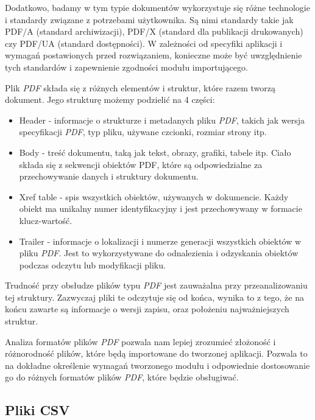 \documentclass[a4paper,twoside,12pt]{book}
\begin{document}
Dodatkowo, badamy w tym typie dokumentów wykorzystuje się różne technologie i standardy związane z potrzebami użytkownika. Są nimi standardy takie jak PDF/A (standard archiwizacji), PDF/X (standard dla publikacji drukowanych) czy PDF/UA (standard dostępności). W zależności od specyfiki aplikacji i wymagań postawionych przed rozwiązaniem, konieczne może być uwzględnienie tych standardów i zapewnienie zgodności modułu importującego.

Plik \emph{PDF} składa się z różnych elementów i struktur, które razem tworzą dokument. Jego strukturę możemy podzielić na 4 części: 
\begin{itemize}
\item Header - informacje o strukturze i metadanych pliku \emph{PDF}, takich jak wersja specyfikacji \emph{PDF}, typ pliku, używane czcionki, rozmiar strony itp.
\item Body - treść dokumentu, taką jak tekst, obrazy, grafiki, tabele itp. Ciało składa się z sekwencji obiektów PDF, które są odpowiedzialne za przechowywanie danych i struktury dokumentu.
\item Xref table - spis wszystkich obiektów, używanych w dokumencie. Każdy obiekt ma unikalny numer identyfikacyjny i jest przechowywany w formacie klucz-wartość.
\item Trailer - informacje o lokalizacji i numerze generacji wszystkich obiektów w pliku \emph{PDF}. Jest to wykorzystywane do odnalezienia i odzyskania obiektów podczas odczytu lub modyfikacji pliku.
\end{itemize}

Trudność przy obsłudze plików typu \emph{PDF} jest zauważalna przy przeanalizowaniu tej struktury. Zazwyczaj pliki te odczytuje się od końca, wynika to z tego, że na końcu zawarte są informacje o wersji zapisu, oraz położeniu najważniejszych struktur.

Analiza formatów plików \emph{PDF} pozwala nam lepiej zrozumieć złożoność i różnorodność plików, które będą importowane do tworzonej aplikacji. Pozwala to na dokładne określenie wymagań tworzonego modułu i odpowiednie dostosowanie go do różnych formatów plików \emph{PDF}, które będzie obsługiwać.

\subsection{Pliki CSV}
\end{document}
